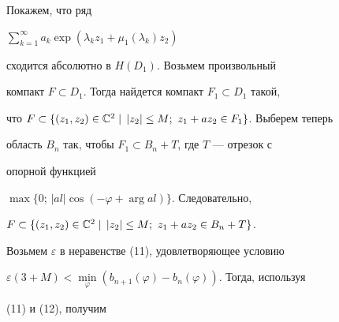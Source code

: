  


Покажем, что ряд 


$\sum\limits^\infty_{k=1}a_k\exp(\lambda_k z_1+\mu_1(\lambda_k)z_2)$ 


сходится абсолютно в $H(D_1)$. Возьмем произвольный 


компакт $F\subset D_1$. Тогда найдется компакт $F_1\subset D_1$ такой, 


что $F\subset\{(z_1,z_2)\in\Bbb C^2\mid\,|z_2|\le M;\ z_1+a z_2\in 


F_1\}$. Выберем теперь 


область $B_n$ так, чтобы $F_1\subset B_n+T$, где $T$ --- отрезок с 


опорной функцией 


$\max\{0;\,|al|\cos(-\varphi+\arg al)\}$. Следовательно, 


$F\subset\{(z_1,z_2)\in\Bbb C^2\mid\,|z_2|\le M;\ z_1+a z_2\in B_n+ 


T\}$. 


Возьмем $\varepsilon$ в неравенстве (11), удовлетворяющее условию 


$\varepsilon(3+M)<\min\limits_\varphi(b_{n+1}(\varphi)- 


b_n(\varphi))$. Тогда, используя 


(11) и (12), получим 


